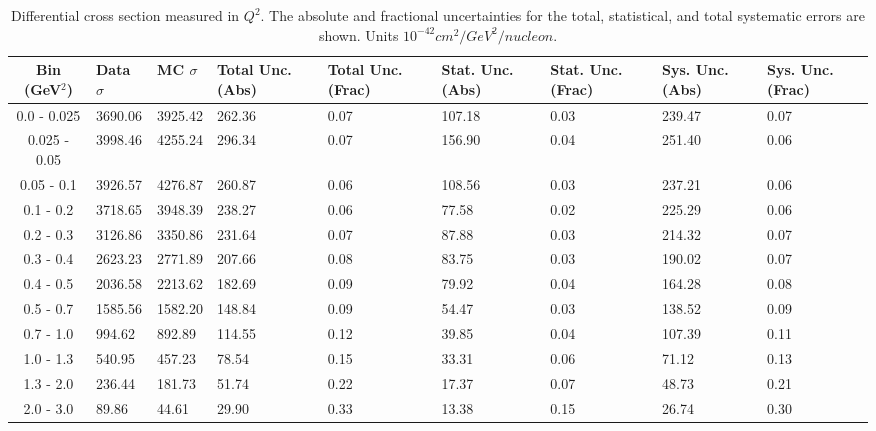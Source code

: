 \begin{table}[!htb]
    \centering
    \tiny
    \begin{tabular}{|c|p{0.5in}|p{0.5in}|p{0.5in}|p{0.5in}|p{0.5in}|p{0.5in}|p{0.5in}|p{0.5in}|}

        \hline
        Bin (GeV$^2$)& Data $\sigma$ & MC $\sigma$ & Total Unc. (Abs) & Total Unc. (Frac)  & Stat. Unc. (Abs) & Stat. Unc. (Frac) & Sys. Unc. (Abs) & Sys. Unc. (Frac)\\ \hline
0.0 - 0.025 & 3690.06 & 3925.42 & 262.36 & 0.07 & 107.18 & 0.03 & 239.47 & 0.07\\ \hline
0.025 - 0.05 & 3998.46 & 4255.24 & 296.34 & 0.07 & 156.90 & 0.04 & 251.40 & 0.06\\ \hline
0.05 - 0.1 & 3926.57 & 4276.87 & 260.87 & 0.06 & 108.56 & 0.03 & 237.21 & 0.06\\ \hline
0.1 - 0.2 & 3718.65 & 3948.39 & 238.27 & 0.06 & 77.58 & 0.02 & 225.29 & 0.06\\ \hline
0.2 - 0.3 & 3126.86 & 3350.86 & 231.64 & 0.07 & 87.88 & 0.03 & 214.32 & 0.07\\ \hline
0.3 - 0.4 & 2623.23 & 2771.89 & 207.66 & 0.08 & 83.75 & 0.03 & 190.02 & 0.07\\ \hline
0.4 - 0.5 & 2036.58 & 2213.62 & 182.69 & 0.09 & 79.92 & 0.04 & 164.28 & 0.08\\ \hline
0.5 - 0.7 & 1585.56 & 1582.20 & 148.84 & 0.09 & 54.47 & 0.03 & 138.52 & 0.09\\ \hline
0.7 - 1.0 & 994.62 & 892.89 & 114.55 & 0.12 & 39.85 & 0.04 & 107.39 & 0.11\\ \hline
1.0 - 1.3 & 540.95 & 457.23 & 78.54 & 0.15 & 33.31 & 0.06 & 71.12 & 0.13\\ \hline
1.3 - 2.0 & 236.44 & 181.73 & 51.74 & 0.22 & 17.37 & 0.07 & 48.73 & 0.21\\ \hline
2.0 - 3.0 & 89.86 & 44.61 & 29.90 & 0.33 & 13.38 & 0.15 & 26.74 & 0.30\\ \hline



    \end{tabular}
    \caption{Differential cross section measured in $Q^2$. The absolute and fractional uncertainties for the total, statistical, and total systematic errors are shown. Units $10^{-42}cm^2/GeV^2/nucleon$.}
    \label{tab:ApdxA:XSecTable1Dq2}
\end{table}

